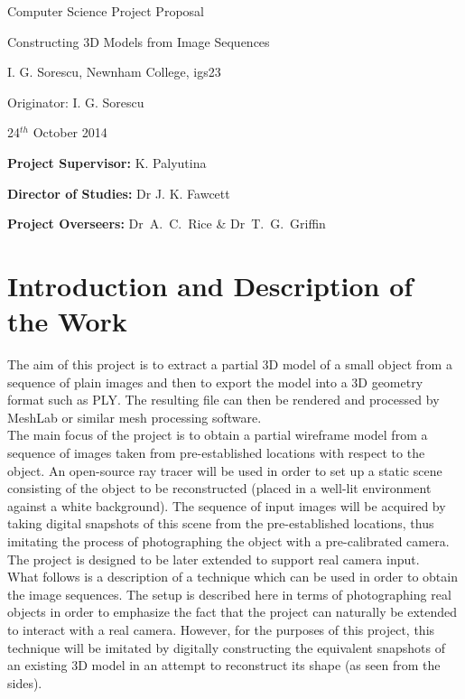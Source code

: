 
\vfil

\centerline{\Large Computer Science Project Proposal}
\vspace{0.4in}
\centerline{\Large Constructing 3D Models from Image Sequences}
\vspace{0.4in}
\centerline{\large I. G. Sorescu, Newnham College, igs23}
\vspace{0.3in}
\centerline{\large Originator: I. G. Sorescu}
\vspace{0.3in}
\centerline{\large 24$^{th}$ October 2014}

\vfil


\noindent
{\bf Project Supervisor:} K. Palyutina
\vspace{0.2in}

\noindent
{\bf Director of Studies:} Dr J. K. Fawcett
\vspace{0.2in}
\noindent
 
\noindent
{\bf Project Overseers:} Dr~A.~C.~Rice  \& Dr~T.~G.~Griffin



\section*{Introduction and Description of the Work}

The aim of this project is to extract a partial 3D model of a small object from a sequence of plain images and then to export the model into a 3D geometry format such as PLY. The resulting file can then be rendered and processed by MeshLab or similar mesh processing software.\\

The main focus of the project is to obtain a partial wireframe model from a sequence of images taken from pre-established locations with respect to the object. An open-source ray tracer will be used in order to set up a static scene consisting of the object to be reconstructed (placed in a well-lit environment against a white background). The sequence of input images will be acquired by taking digital snapshots of this scene from the pre-established locations, thus imitating the process of photographing the object with a pre-calibrated camera. The project is designed to be later extended to support real camera input.\\  

What follows is a description of a technique which can be used in order to obtain the image sequences. The setup is described here in terms of photographing real objects in order to emphasize the fact that the project can naturally be extended to interact with a real camera. However, for the purposes of this project, this technique will be imitated by digitally constructing the equivalent snapshots of an existing 3D model in an attempt to reconstruct its shape (as seen from the sides).\\

